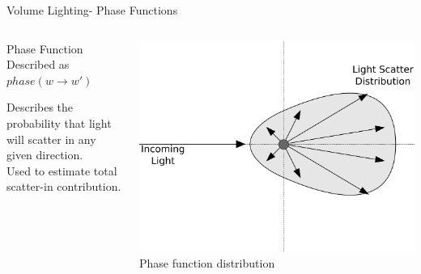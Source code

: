 \documentclass[10pt,compress,professionalfont]{beamer}
\begin{document}
\begin{frame}{Volume Lighting- Phase Functions}


    \begin{columns}
        \begin{column}{0.5\textwidth}

            \begin{block}{Phase Function}
                Described as $phase(w \to w')$
            \end{block}
            \vspace{5mm}

            Describes the probability that light will scatter in any given direction.\\
            \vspace{5mm}
            Used to estimate total scatter-in contribution.


        \end{column}
        \begin{column}{0.5\textwidth}
            \vspace{10mm}
            \includegraphics[width=\textwidth]{../img/diag/phase_func_sm}\\
            {\centering\scriptsize Phase function distribution\\}
        \end{column}
    \end{columns}

\end{frame}
\end{document}
